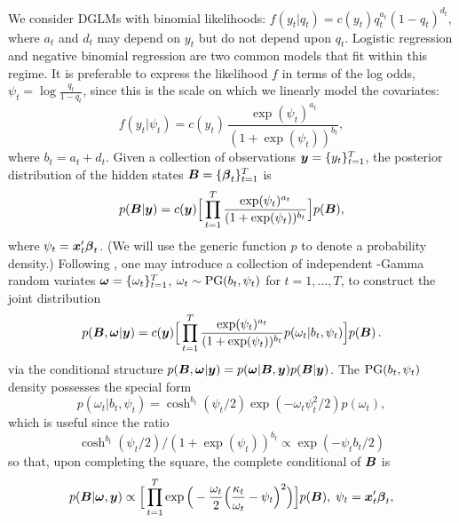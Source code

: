 We consider DGLMs with binomial likelihoods: \( f(y_t | q_t) = c(y_t) q_t^{a_t}
(1-q_t)^{d_t}, \) where $a_t$ and $d_t$ may depend on $y_t$ but do not depend
upon $q_t$.  Logistic regression and negative binomial regression are two common
models that fit within this regime.  It is preferable to express the likelihood
$f$ in terms of the log odds, $\psi_t = \log \frac{q_t}{1-q_t}$, since this is
the scale on which we linearly model the covariates:
\[
f(y_t | \psi_t) = c(y_t) \, \frac{\exp(\psi_t)^{a_t}}{(1+\exp(\psi_t))^{b_t}},
\]
where $b_t = a_t + d_t$.  Given a collection of observations $\boldsymbol{y} =
\{y_t\}_{t=1}^T$, the posterior distribution of the hidden states ${\boldsymbol{B}} =
\{\boldsymbol{\beta}_t\}_{t=1}^T$ is
\[
p({\boldsymbol{B}} | \boldsymbol{y}) = c(\boldsymbol{y}) \Big[ \prod_{t=1}^T
\frac{\exp({\psi_t})^{a_t}}{(1+\exp({\psi_t}))^{b_t}}
\Big] p({\boldsymbol{B}}),
\]
where $\psi_t = \boldsymbol{x}_t' \boldsymbol{\beta}_t$.  (We will use the generic function $p$ to
denote a probability density.)  Following \citet{polson-etal-2013}, one may
introduce a collection of independent \Polya-Gamma random variates $\boldsymbol{\omega} =
\{\omega_t\}_{t=1}^T$, $\omega_t \sim \text{PG}(b_t, \psi_t)$ for $t=1, \ldots, T$, to
construct the joint distribution
\[
p({\boldsymbol{B}}, \boldsymbol{\omega} | \boldsymbol{y}) = c(\boldsymbol{y}) \Big[ \prod_{t=1}^T
\frac{\exp({\psi_t})^{a_t}}{(1+\exp({\psi_t}))^{b_t}} p(\omega_t | b_t, \psi_t)
\Big] p({\boldsymbol{B}}) \, .
\]
via the conditional structure $p({\boldsymbol{B}}, \boldsymbol{\omega} | \boldsymbol{y}) = p(\boldsymbol{\omega} | {\boldsymbol{B}},
\boldsymbol{y}) p({\boldsymbol{B}} | \boldsymbol{y})$.  The $\text{PG}{}(b_t, \psi_t)$ density possesses the special
form
\[
p(\omega_t | b_t, \psi_t) = \cosh^{b_t}(\psi_t/2) \exp({- \omega_t \psi_t^2 / 2})
p(\omega_t),
\]
which is useful since the ratio
\begin{equation}
  \label{eqn:pg-cancellation}
  \cosh^{b_t}(\psi_t/2) / (1+\exp({\psi_t}))^{b_t}
  \propto
  \exp({-\psi_t b_t/2}) 
\end{equation}
so that, upon completing the square, the complete conditional of ${\boldsymbol{B}}$ is
\[
p({\boldsymbol{B}} | \boldsymbol{\omega}, \boldsymbol{y}) \propto \Big[ \prod_{t=1}^T \exp \Big(-\frac{\omega_t}{2}
\Big(\frac{\kappa_t}{\omega_t} - \psi_t\Big)^2 \Big) \Big] p({\boldsymbol{B}}), \; \psi_t
= \boldsymbol{x}_t' \boldsymbol{\beta}_t,
\]
